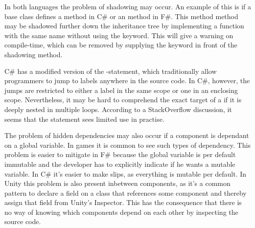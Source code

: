 In both languages the problem of shadowing may occur. An example of this is if a base class defines a  method in C\# or an  method in F\#. This method method may be shadowed further down the inheritance tree by implementing a function with the same name without using the  keyword. This will give a warning on compile-time, which can be removed by supplying the  keyword in front of the shadowing method.

C\# has a modified version of the -statement, which traditionally allow programmers to jump to labels anywhere in the source code. In C\#, however, the jumps are restricted to either a label in the same scope or one in an enclosing scope\cite{csharp:goto}. Nevertheless, it may be hard to comprehend the exact target of a  if it is deeply nested in multiple loops. According to a StackOverflow discussion\cite{goto:stack:overflow}, it seems that the  statement sees limited use in practise.

The problem of hidden dependencies may also occur if a component is dependant on a global variable. In games it is common to see such types of dependency\cite{blow2004game, guana2015building, nystrom2014game}. This problem is easier to mitigate in F\# because the global variable is per default immutable and the developer has to explicitly indicate if he wants a mutable variable. In C\# it's easier to make slips, as everything is mutable per default. In Unity this problem is also present inbetween components, as it's a common pattern to declare a field on a class that references some component and thereby assign that field from Unity's Inspector\cite{unity:inspector:assignment}. This has the consequence that there is no way of knowing which components depend on each other by inspecting the source code.
